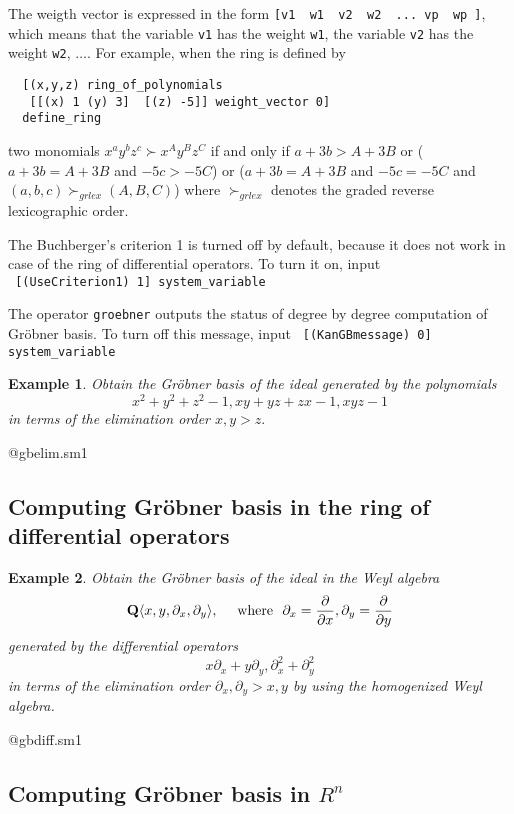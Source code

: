 \documentclass{article}
\def\pd#1{ \partial_{#1} }
\newtheorem{example}{Example}
\begin{document}
The weigth vector is expressed in the form
{\tt [v1 \  w1 \ v2 \ w2 \  ... vp \ wp ]},
which
means that the variable {\tt v1} has the weight {\tt w1},
the variable {\tt v2} has the weight {\tt w2}, $\ldots$.
For example,
when the ring is defined by
\begin{verbatim}
  [(x,y,z) ring_of_polynomials 
   [[(x) 1 (y) 3]  [(z) -5]] weight_vector 0]
  define_ring
\end{verbatim}
two monomials 
$x^a y^b z^c \succ x^A y^B z^C$
if and only if
$ a+3b > A+3B$ or
($ a+3b = A+3B$ and $ -5 c > -5 C$)
or
($ a+3b = A+3B$ and $ -5 c = -5 C$ and $(a,b,c) \succ_{grlex} (A,B,C)$)
where $\succ_{grlex}$ denotes the graded reverse lexicographic order.
\bigbreak

The Buchberger's criterion 1 is turned off by default,
because it does not work in case of the ring of differential operators.
To turn it on,
input \\
\verb! [(UseCriterion1) 1] system_variable !

The operator {\tt groebner} outputs the status of degree by degree computation
of Gr\"obner basis.
To turn off this message, input
\verb! [(KanGBmessage) 0] system_variable !


\begin{example}
Obtain the Gr\"obner basis of the ideal generated by 
the polynomials 
$$x^2+y^2+z^2-1,xy+yz+zx-1,  xyz-1                   $$
in terms of the 
elimination order 
$ x,y > z. $
\end{example}

@gbelim.sm1
\bigbreak


\subsection{Computing Gr\"obner basis in the ring of differential operators}

\begin{example}
Obtain the Gr\"obner basis of the ideal in the Weyl algebra
$$  {\bf Q } \langle x,y,\pd{x},\pd{y} \rangle, \quad \hbox{ where }\ 
    \pd{x}=\frac{\partial}{\partial x},
    \pd{y}=\frac{\partial}{\partial y}
$$
generated by 
the differential operators
$$ x \pd{x} + y \pd{y},
   \pd{x}^2 + \pd{y}^2
$$
in terms of the elimination order 
$ \pd{x}, \pd{y} > x,y $
by using the homogenized Weyl algebra.
\end{example}

@gbdiff.sm1
\bigbreak

\subsection{Computing Gr\"obner basis in $R^n$}
\end{document}
